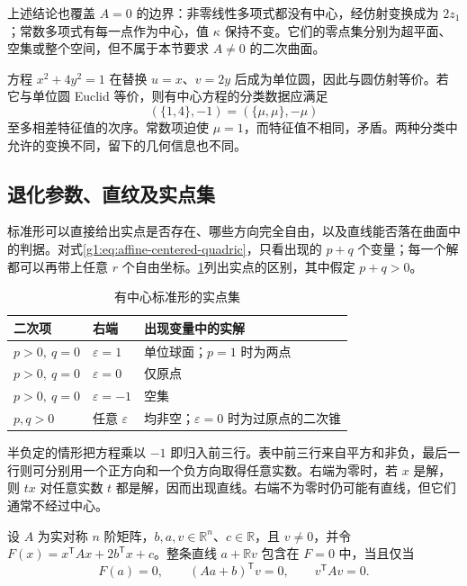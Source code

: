 上述结论也覆盖 \(A=0\) 的边界：非零线性多项式都没有中心，经仿射变换成为 \(2z_1\)；常数多项式有每一点作为中心，值 \(\kappa\) 保持不变。它们的零点集分别为超平面、空集或整个空间，但不属于本节要求 \(A\ne0\) 的二次曲面。

\begin{example}
	\label{g1:exm:ellipses-affine-euclidean}
	方程 \(x^2+4y^2=1\) 在替换 \(u=x\)、\(v=2y\) 后成为单位圆，因此与圆仿射等价。若它与单位圆 Euclid 等价，则有中心方程的分类数据应满足
	\[
		(\{1,4\},-1)=(\{\mu,\mu\},-\mu)
	\]
	至多相差特征值的次序。常数项迫使 \(\mu=1\)，而特征值不相同，矛盾。两种分类中允许的变换不同，留下的几何信息也不同。
\end{example}

\subsection{退化参数、直纹及实点集}
\label{g1:subsec:0202:04}

标准形可以直接给出实点是否存在、哪些方向完全自由，以及直线能否落在曲面中的判据。对式\eqref{g1:eq:affine-centered-quadric}，只看出现的 \(p+q\) 个变量；每一个解都可以再带上任意 \(r\) 个自由坐标。\cref{g1:tab:affine-real-quadric-types}列出实点的区别，其中假定 \(p+q>0\)。

\begin{table}[htbp]
	\centering
	\caption{有中心标准形的实点集}
	\label{g1:tab:affine-real-quadric-types}
	\begin{tabularx}{\linewidth}{@{}l l X@{}}
		\toprule
		二次项 & 右端 & 出现变量中的实解 \\
		\midrule
		\(p>0,\ q=0\) & \(\varepsilon=1\) & 单位球面；\(p=1\) 时为两点 \\
		\(p>0,\ q=0\) & \(\varepsilon=0\) & 仅原点 \\
		\(p>0,\ q=0\) & \(\varepsilon=-1\) & 空集 \\
		\(p,q>0\) & 任意 \(\varepsilon\) & 均非空；\(\varepsilon=0\) 时为过原点的二次锥 \\
		\bottomrule
	\end{tabularx}
\end{table}

半负定的情形把方程乘以 \(-1\) 即归入前三行。表中前三行来自平方和非负，最后一行则可分别用一个正方向和一个负方向取得任意实数。右端为零时，若 \(x\) 是解，则 \(tx\) 对任意实数 \(t\) 都是解，因而出现直线。右端不为零时仍可能有直线，但它们通常不经过中心。

\begin{proposition}
	\label{g1:prop:affine-quadric-line}
	设 \(A\) 为实对称 \(n\) 阶矩阵，\(b,a,v\in\mathbb R^n\)、\(c\in\mathbb R\)，且 \(v\ne0\)，并令 \(F(x)=x^{\mathsf T}Ax+2b^{\mathsf T}x+c\)。整条直线 \(a+\mathbb Rv\) 包含在 \(F=0\) 中，当且仅当
	\[
		F(a)=0,\qquad (Aa+b)^{\mathsf T}v=0,
		\qquad v^{\mathsf T}Av=0.
	\]
\end{proposition}

